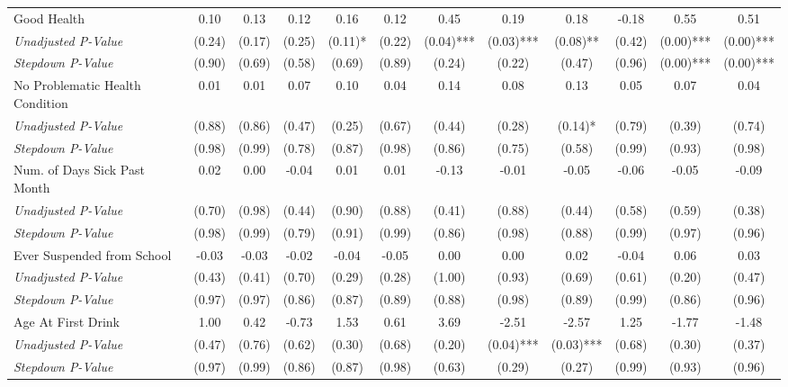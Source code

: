 \begin{tabular}{l c c c c c c c c c c c}
Good Health & 0.10 & 0.13 & 0.12 & 0.16 & 0.12 & 0.45 & 0.19 & 0.18 & -0.18 & 0.55 & 0.51 \\
\quad \textit{Unadjusted P-Value} & (0.24) & (0.17) & (0.25) & (0.11)* & (0.22) & (0.04)*** & (0.03)*** & (0.08)** & (0.42) & (0.00)*** & (0.00)*** \\
\quad \textit{Stepdown P-Value} & (0.90) & (0.69) & (0.58) & (0.69) & (0.89) & (0.24) & (0.22) & (0.47) & (0.96) & (0.00)*** & (0.00)*** \\
No Problematic Health Condition & 0.01 & 0.01 & 0.07 & 0.10 & 0.04 & 0.14 & 0.08 & 0.13 & 0.05 & 0.07 & 0.04 \\
\quad \textit{Unadjusted P-Value} & (0.88) & (0.86) & (0.47) & (0.25) & (0.67) & (0.44) & (0.28) & (0.14)* & (0.79) & (0.39) & (0.74) \\
\quad \textit{Stepdown P-Value} & (0.98) & (0.99) & (0.78) & (0.87) & (0.98) & (0.86) & (0.75) & (0.58) & (0.99) & (0.93) & (0.98) \\
Num. of Days Sick Past Month & 0.02 & 0.00 & -0.04 & 0.01 & 0.01 & -0.13 & -0.01 & -0.05 & -0.06 & -0.05 & -0.09 \\
\quad \textit{Unadjusted P-Value} & (0.70) & (0.98) & (0.44) & (0.90) & (0.88) & (0.41) & (0.88) & (0.44) & (0.58) & (0.59) & (0.38) \\
\quad \textit{Stepdown P-Value} & (0.98) & (0.99) & (0.79) & (0.91) & (0.99) & (0.86) & (0.98) & (0.88) & (0.99) & (0.97) & (0.96) \\
Ever Suspended from School & -0.03 & -0.03 & -0.02 & -0.04 & -0.05 & 0.00 & 0.00 & 0.02 & -0.04 & 0.06 & 0.03 \\
\quad \textit{Unadjusted P-Value} & (0.43) & (0.41) & (0.70) & (0.29) & (0.28) & (1.00) & (0.93) & (0.69) & (0.61) & (0.20) & (0.47) \\
\quad \textit{Stepdown P-Value} & (0.97) & (0.97) & (0.86) & (0.87) & (0.89) & (0.88) & (0.98) & (0.89) & (0.99) & (0.86) & (0.96) \\
Age At First Drink & 1.00 & 0.42 & -0.73 & 1.53 & 0.61 & 3.69 & -2.51 & -2.57 & 1.25 & -1.77 & -1.48 \\
\quad \textit{Unadjusted P-Value} & (0.47) & (0.76) & (0.62) & (0.30) & (0.68) & (0.20) & (0.04)*** & (0.03)*** & (0.68) & (0.30) & (0.37) \\
\quad \textit{Stepdown P-Value} & (0.97) & (0.99) & (0.86) & (0.87) & (0.98) & (0.63) & (0.29) & (0.27) & (0.99) & (0.93) & (0.96) \\
\bottomrule
\end{tabular}
